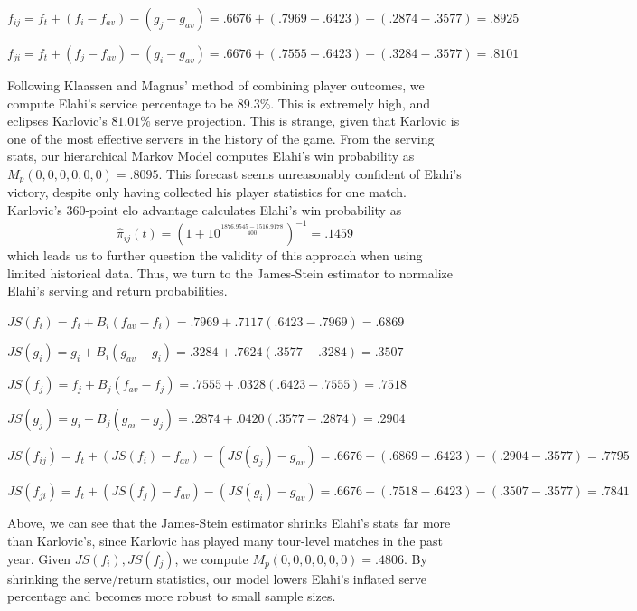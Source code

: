 \documentclass[chapterprefix=false]{report}
\begin{document}
\begin{center}
$f_{ij} = f_t + (f_i-f_{av})-(g_j-g_{av}) = .6676 + (.7969-.6423) - (.2874-.3577) = .8925$

$f_{ji} = f_t + (f_j-f_{av})-(g_i-g_{av}) = .6676 + (.7555-.6423) - (.3284-.3577) = .8101$
\end{center}

Following Klaassen and Magnus' method of combining player outcomes, we compute Elahi's service percentage to be $89.3\%$. This is extremely high, and eclipses Karlovic's $81.01\%$ serve projection. This is strange, given that Karlovic is one of the most effective servers in the history of the game. From the serving stats, our hierarchical Markov Model computes Elahi's win probability as $M_p(0,0,0,0,0,0) = .8095$. This forecast seems unreasonably confident of Elahi's victory, despite only having collected his player statistics for one match. Karlovic's 360-point elo advantage calculates Elahi's win probability as $$\hat{\pi}_{ij}(t) = (1+10^\frac{1876.9545 - 1516.9178}{400})^{-1} = .1459$$ which leads us to further question the validity of this approach when using limited historical data. Thus, we turn to the James-Stein estimator to normalize Elahi's serving and return probabilities.

\begin{center}
$JS(f_i) = f_i + B_i(f_{av}-f_i) = .7969 + .7117(.6423-.7969) = .6869$

$JS(g_i) = g_i + B_i(g_{av}-g_i) = .3284 + .7624(.3577-.3284) = .3507$

$JS(f_j) = f_j + B_j(f_{av}-f_j) = .7555 + .0328(.6423-.7555) = .7518$

$JS(g_j) = g_i + B_j(g_{av}-g_j) = .2874 + .0420(.3577-.2874) = .2904$

$JS(f_{ij}) = f_t + (JS(f_i)-f_{av})-(JS(g_j)-g_{av}) = .6676 + (.6869-.6423) - (.2904-.3577) = .7795$

$JS(f_{ji}) = f_t + (JS(f_j)-f_{av})-(JS(g_i)-g_{av}) = .6676 + (.7518-.6423) - (.3507-.3577) = .7841$

\end{center}

Above, we can see that the James-Stein estimator shrinks Elahi's stats far more than Karlovic's, since Karlovic has played many tour-level matches in the past year. Given $JS(f_i),JS(f_j)$, we compute $M_p(0,0,0,0,0,0) = .4806$. By shrinking the serve/return statistics, our model lowers Elahi's inflated serve percentage and becomes more robust to small sample sizes.
\end{document}

